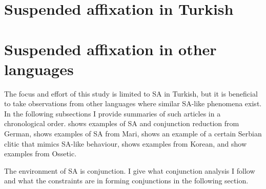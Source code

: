 \section{Suspended affixation in Turkish}
















\section{Suspended affixation in other languages}

The focus and effort of this study is limited to SA in Turkish, but it is beneficial to take observations from other languages where similar SA-like phenomena exist. In the following subsections I provide summaries of such articles in a chronological order. \cite{pounder2006broken} shows examples of SA and conjunction reduction from German, \cite{guseva2017postsyntactic} shows examples of SA from Mari, \cite{despic2017suspended} shows an example of a certain Serbian clitic that mimics SA-like behaviour, \cite{yoon2017lexical} shows examples from Korean, and \cite{erschler2012suspended,erschler2018suspended} show examples from Ossetic.













The environment of SA is conjunction. I give what conjunction analysis I follow and what the constraints are in forming conjunctions in the following section.

